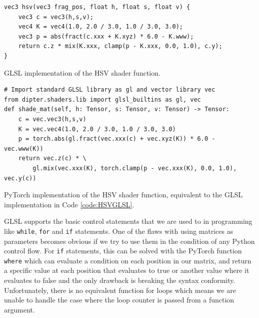 \begin{codefig}
\begin{verbatim}
vec3 hsv(vec3 frag_pos, float h, float s, float v) {
    vec3 c = vec3(h,s,v);
    vec4 K = vec4(1.0, 2.0 / 3.0, 1.0 / 3.0, 3.0);
    vec3 p = abs(fract(c.xxx + K.xyz) * 6.0 - K.www);
    return c.z * mix(K.xxx, clamp(p - K.xxx, 0.0, 1.0), c.y);
}
\end{verbatim}
\caption{GLSL implementation of the HSV shader function.}
\label{code:HSVGLSL}
\end{codefig}

\begin{codefig}
\begin{verbatim}
# Import standard GLSL library as gl and vector library vec
from dipter.shaders.lib import glsl_builtins as gl, vec  
def shade_mat(self, h: Tensor, s: Tensor, v: Tensor) -> Tensor:
    c = vec.vec3(h,s,v)
    K = vec.vec4(1.0, 2.0 / 3.0, 1.0 / 3.0, 3.0)
    p = torch.abs(gl.fract(vec.xxx(c) + vec.xyz(K)) * 6.0 - vec.www(K))
    return vec.z(c) * \
        gl.mix(vec.xxx(K), torch.clamp(p - vec.xxx(K), 0.0, 1.0), vec.y(c))
\end{verbatim}
\caption{PyTorch implementation of the HSV shader function, equivalent to the GLSL implementation in Code \ref{code:HSVGLSL}.}
\label{code:HSVPyTorch}
\end{codefig}

GLSL supports the basic control statements that we are used to in programming like \texttt{while}, \texttt{for} and \texttt{if} statements. One of the flaws with using matrices as parameters becomes obvious if we try to use them in the condition of any Python control flow. For \texttt{if} statements, this can be solved with the PyTorch function \texttt{where} which can evaluate a condition on each position in our matrix, and return a specific value at each position that evaluates to true or another value where it evaluates to false and the only drawback is breaking the syntax conformity. Unfortunately, there is no equivalent function for loops which means we are unable to handle the case where the loop counter is passed from a function argument.

